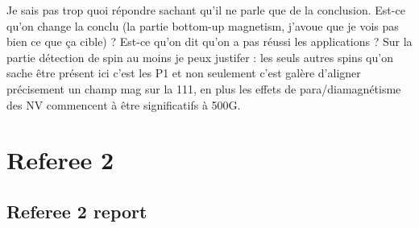 \documentclass{article}
\begin{document}
Je sais pas trop quoi répondre sachant qu'il ne parle que de la conclusion. Est-ce qu'on change la conclu (la partie bottom-up magnetism, j'avoue que je vois pas bien ce que ça cible) ? Est-ce qu'on dit qu'on a pas réussi les applications ? Sur la partie détection de spin au moins je peux justifer : les seuls autres spins qu'on sache être présent ici c'est les P1 et non seulement c'est galère d'aligner précisement un champ mag sur la 111, en plus les effets de para/diamagnétisme des NV commencent à être significatifs à 500G.

\section*{Referee 2}
\subsection*{Referee 2 report}
\end{document}
